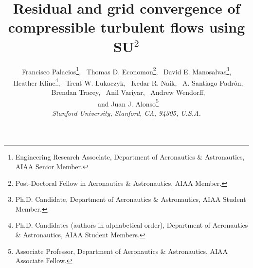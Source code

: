 
\title{Residual and grid convergence of compressible turbulent flows using SU$^2$}

 \author{
     Francisco Palacios\thanks{Engineering Research Associate, Department of Aeronautics \& Astronautics, AIAA Senior Member.},
     \ Thomas D. Economon\thanks{Post-Doctoral Fellow in Aeronautics \& Astronautics, AIAA Member.},
     \ David E. Manosalvas\thanks{Ph.D. Candidate, Department of Aeronautics \& Astronautics, AIAA Student Member.},\\
     \ Heather Kline\thanks{Ph.D. Candidates (authors in alphabetical order), Department of Aeronautics \& Astronautics, AIAA Student Members.},
     \ Trent W. Lukaczyk,
     \ Kedar R. Naik, 
     \ A. Santiago Padr\'on,\\
     \ Brendan Tracey,
     \ Anil Variyar,
     \ Andrew Wendorff,\\
   \ and Juan J. Alonso\thanks{Associate Professor, Department of Aeronautics \& Astronautics, AIAA Associate Fellow.}\\
  {\normalsize\itshape Stanford University, Stanford, CA, 94305, U.S.A.}
 }


